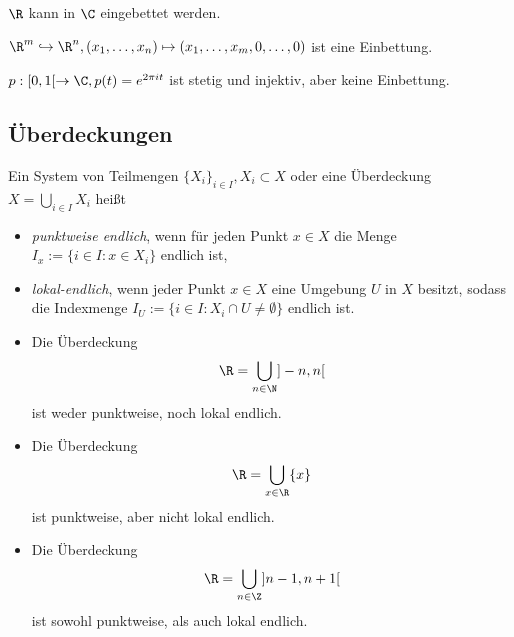 \begin{ex}
	$\R$ kann in $\C$ eingebettet werden.
\end{ex}


\begin{ex}
	$\R^m \injto \R^n, (x_1, \dotsc, x_n) \mapsto (x_1, \dotsc, x_m, 0, \dotsc, 0)$ ist eine Einbettung.

	$p: [0,1[ \to \C, p(t) = e^{2\pi i t}$ ist stetig und injektiv, aber keine Einbettung.
\end{ex}

\subsection{Überdeckungen}

\begin{df}
	Ein System von Teilmengen $\{X_i\}_{i\in I}, X_i \subset X$ oder eine Überdeckung $X = \bigcup_{i\in I} X_i$ heißt
	\begin{itemize}
		\item
			\emph{punktweise endlich}, wenn für jeden Punkt $x \in X$ die Menge $I_x := \{ i \in I : x \in X_i \}$ endlich ist,
		\item
			\emph{lokal-endlich}, wenn jeder Punkt $x \in X$ eine Umgebung $U$ in $X$ besitzt, sodass die Indexmenge $I_U := \{ i \in I : X_i \cap U \neq \emptyset \}$ endlich ist.
	\end{itemize}
\end{df}

\begin{ex}
	\begin{itemize}
		\item
			Die Überdeckung
			\[
				\R = \bigcup_{n \in \N} ]-n, n[
			\]
			ist weder punktweise, noch lokal endlich.
		\item
			Die Überdeckung
			\[
				\R = \bigcup_{x \in \R} \{x\}
			\]
			ist punktweise, aber nicht lokal endlich.
		\item
			Die Überdeckung
			\[
				\R = \bigcup_{n\in \Z} ]n-1, n+ 1[
			\]
			ist sowohl punktweise, als auch lokal endlich.
	\end{itemize}
\end{ex}

